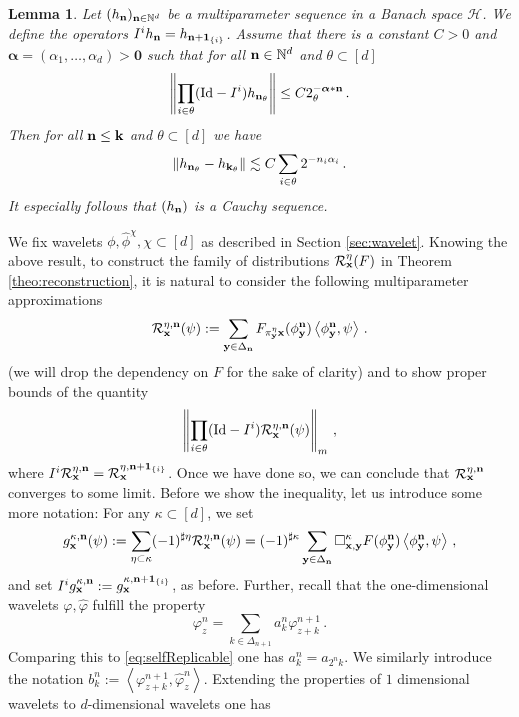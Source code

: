 \documentclass[12pt]{article}
\numberwithin{equation}{section}
\theoremstyle{plain}
\newtheorem{lemma}[theorem]{Lemma}
\theoremstyle{definition}
\newcommand{\scalar}[1]{\left\langle #1 \right\rangle}
\newcommand{\norm}[1]{\left\Vert #1\right\Vert}
\newcommand{\Id}{\mbox{Id}}
\def\cR{\mathcal{R}}\def\cE{\mathcal{E}}
\def\fk{\mathbf k}\def\fl{\mathbf l}
\def\fy{\mathbf y}\def\fz{\mathbf z}
\def\falpha{{\boldsymbol\alpha}}
\def\foo{{\boldsymbol 0}}
\def\fone{{\boldsymbol 1}}
\begin{document}
\begin{lemma}\label{lem:technical2}
Let $(h_{\mathbf n})_{\mathbf n\in\mathbb{N}^{d}}$ be a multiparameter sequence in a Banach space $\mathcal H$. We define the operators $I^ih_{\fn} = h_{\fn+\fone_{\{i\}}}$. Assume that there is a constant $C>0$ and $\falpha = (\alpha_1,\dots,\alpha_d)>\foo$ such that for all $\mathbf n\in\mathbb{N}^d$ and $\theta\subset[d]$
%
\begin{equation*}
    \norm{\prod_{i\in\theta} (\Id- I^i)h_{\fn_\theta}} \le C2^{-\falpha*\fn}_{\theta}\,.
\end{equation*}
Then for all $\fn\le\fk$ and $\theta\subset[d]$ we have
\begin{equation*}
    \norm{h_{\fn_\theta}-h_{\fk_\theta}}\lesssim C\sum_{i\in\theta}2^{-n_i\alpha_i}\,.
\end{equation*}
%
It especially follows that $(h_{\mathbf n})$ is a Cauchy sequence.
\end{lemma}
We fix wavelets $\phi,\hat\phi^\chi, \chi\subset[d]$ as described in Section \ref{sec:wavelet}. Knowing the above result, to construct the family of distributions $\mathcal{R}_\mathbf x^\eta(F)$ in Theorem \ref{theo:reconstruction}, it is natural to consider the following multiparameter approximations
\[
    \mathcal{R}^{\eta,\fn}_\fx(\psi) := \sum_{\fy\in\Delta_\fn} F_{\pi^\eta_\fy \fx}(\phi^\fn_\fy)\scalar{\phi^\fn_\fy,\psi}\,.
\]
(we will drop the dependency on $F$ for the sake of clarity) and to show proper bounds of the quantity 
\begin{equation}\label{eq:fN}
    \norm{\prod_{i\in\theta}(\Id- I^i)\mathcal{R}^{\eta,\fn}_\fx(\psi)}_m\,,
\end{equation}
where $I^i\mathcal{R}^{\eta,\fn}_\fx = \cR^{\eta,\fn+\fone_{\{i\}}}_\fx$. Once we have done so, we can conclude that $\mathcal{R}^{\eta,\mathbf n}_\mathbf x$ converges to some limit. Before we show the inequality, let us introduce some more notation: For any $\kappa\subset[d]$, we set
\begin{equation*}
    g^{\kappa,\fn}_\fx(\psi) := \sum_{\eta\subset\kappa}(-1)^{\sharp\eta}\mathcal{R}^{\eta,\fn}_\fx(\psi) = (-1)^{\sharp\kappa}\sum_{\fy\in\Delta_\fn} \square^\kappa_{\fx,\fy} F(\phi_\fy^\fn)\scalar{\phi_\fy^\fn,\psi}\,,
\end{equation*}
and set $I^ig^{\kappa,\fn}_\fx := g^{\kappa,\fn+\fone_{\{i\}}}_\fx$, as before. Further, recall that the one-dimensional wavelets $\varphi,\hat\varphi$ fulfill the property
\[
    \varphi_z^n = \sum_{k\in\Delta_{n+1}}a_k^n \varphi^{n+1}_{z+k}\,.
\]
Comparing this to \eqref{eq:selfReplicable} one has $a_k^n = a_{2^n k}$. We similarly introduce the notation $b^n_k := \scalar{\varphi_{z+k}^{n+1},\hat\varphi_z^n}$. Extending the properties of $1$ dimensional wavelets to  $d$-dimensional wavelets one has 
\end{document}
